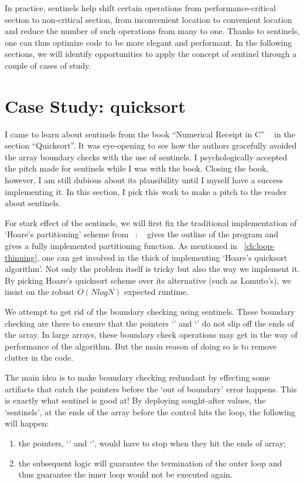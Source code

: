 In practice, sentinels help shift certain operations from performance-critical
section to non-critical section, from inconvenient location to convenient
location and reduce the number of such operations from many to one.
Thanks to sentinels, one can thus optimize code to be more elegant and performant.
In the following sections, we will identify opportunities to apply the concept of sentinel through
a couple of cases of study.



\section{Case Study: quicksort}\label{sec:quick-sort-sentinel}


I came to learn about sentinels from the book ``Numerical Receipt in C''
~\cite{NumericalRecipes:1992} in the section ``Quicksort''.
It was eye-opening to see how the authors gracefully avoided the array boundary checks
with the use of sentinels.
I psychologically accepted the pitch made for sentinels while I was with the book.
Closing the book, however, I am still dubious about its plausibility until I myself have a
success implementing it.
In this section, I pick this work to make a pitch to the reader about sentinels.


For stark effect of the sentinels, we will first fix the traditional implementation of `Hoare's
partitioning' scheme from ~:
~ gives the outline of the program and
~ gives a fully implemented partitioning function.
As mentioned in ~\autoref{ch:loop-thinning}, one can get involved in the thick of implementing
`Hoare's quicksort algorithm'.
Not only the problem itself is tricky but also the way we implement it.
By picking Hoare's quicksort scheme over its alternative (such as Lomuto's),
we insist on the robust $O(N log N)$ expected runtime.


We attempt to get rid of the boundary checking using sentinels.
These boundary checking are there to ensure that the pointers `' and `' do not slip
off the ends of the array.
In large arrays, these boundary check operations may get in the way of performance of the algorithm.
But the main reason of doing so is to remove clutter in the code.


The main idea is to make boundary checking redundant by effecting some artifacts that catch the
pointers before the `out of boundary' error happens.
This is exactly what sentinel is good at!
By deploying sought-after values, the `sentinels', at the ends of the array before the control
hits the loop, the following will happen:
\begin{enumerate}
    \item the pointers, `' and `', would have to stop when they hit the ends of
    array;
    \item the subsequent logic will guarantee the termination of the outer loop and
    thus guarantee the inner loop would not be executed again.
\end{enumerate}


